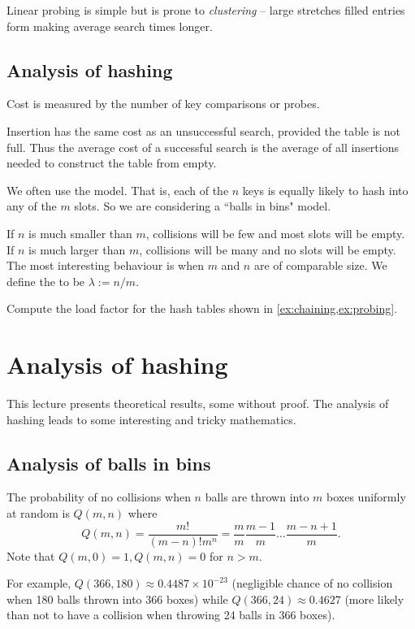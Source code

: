 Linear probing is simple but is prone to \emph{clustering} -- large stretches filled entries form making average search times longer.

\section{Analysis of hashing}
Cost is measured by the number of key comparisons or probes.

Insertion has the same cost as an unsuccessful search, provided the table is not full.
Thus the average cost of a successful search is the average of all insertions needed to construct the table from empty.

We often use the  model. 
That is, each of the $n$ keys is equally likely to hash into any of the $m$ slots. 
So we are considering a ``balls in bins" model.

If $n$ is much smaller than $m$, collisions will be few and most slots will be empty. 
If $n$ is much larger than $m$, collisions will be many and no slots will be empty. 
The most interesting behaviour is when $m$ and $n$ are of comparable size. 
We define the  to be $\lambda := n/m$. 

\begin{Boxample}[4]
Compute the load factor for the hash tables shown in \cref{ex:chaining,ex:probing}.
\end{Boxample}


\chapter{Analysis of hashing} %

This lecture presents theoretical results, some without proof. The analysis of hashing leads to some interesting and tricky mathematics.

\section{Analysis of balls in bins}

The probability of no collisions when $n$ balls are thrown into $m$ boxes 
uniformly at random is $Q(m, n)$ where 
$$Q(m, n) = \frac{m!}{(m-n)! m^n} = \frac{m}{m} \frac{m-1}{m} \dots 
\frac{m - n + 1}{m}\text{.}$$
Note that $Q(m,0) = 1, Q(m, n) = 0$ for $n > m$.

For example, $Q(366, 180) \approx 0.4487
 \times 10^{-23}$  (negligible chance of no collision when 180 balls thrown into 366 boxes) while $Q(366, 24) \approx  0.4627$ (more likely than not to have a collision when throwing 24 balls in 366 boxes).

